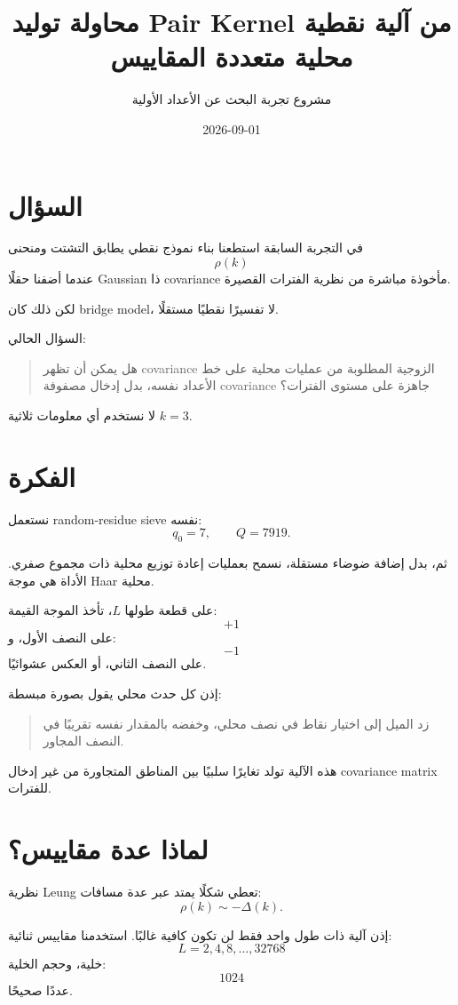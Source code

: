 \documentclass[12pt]{article}
\title{محاولة توليد Pair Kernel من آلية نقطية محلية متعددة المقاييس}
\author{مشروع تجربة البحث عن الأعداد الأولية}
\date{2026-09-01}
\begin{document}
\maketitle

\section{السؤال}

في التجربة السابقة استطعنا بناء نموذج نقطي يطابق التشتت ومنحنى
\[
\rho(k)
\]
عندما أضفنا حقلًا Gaussian ذا covariance مأخوذة مباشرة من نظرية الفترات القصيرة.

لكن ذلك كان bridge model، لا تفسيرًا نقطيًا مستقلًا.

السؤال الحالي:

\begin{quote}
هل يمكن أن تظهر covariance الزوجية المطلوبة من عمليات محلية على خط الأعداد نفسه،
بدل إدخال مصفوفة covariance جاهزة على مستوى الفترات؟
\end{quote}

لا نستخدم أي معلومات ثلاثية \(k=3\).

\section{الفكرة}

نستعمل random-residue sieve نفسه:
\[
q_0=7,\qquad Q=7919.
\]

ثم، بدل إضافة ضوضاء مستقلة، نسمح بعمليات إعادة توزيع محلية ذات مجموع صفري.
الأداة هي موجة Haar محلية.

على قطعة طولها \(L\)، تأخذ الموجة القيمة:
\[
+1
\]
على النصف الأول، و:
\[
-1
\]
على النصف الثاني، أو العكس عشوائيًا.

إذن كل حدث محلي يقول بصورة مبسطة:

\begin{quote}
زد الميل إلى اختيار نقاط في نصف محلي، وخفضه بالمقدار نفسه تقريبًا في النصف المجاور.
\end{quote}

هذه الآلية تولد تغايرًا سلبيًا بين المناطق المتجاورة من غير إدخال
covariance matrix للفترات.

\section{لماذا عدة مقاييس؟}

نظرية Leung تعطي شكلًا يمتد عبر عدة مسافات:
\[
\rho(k)\sim-\Delta(k).
\]

إذن آلية ذات طول واحد فقط لن تكون كافية غالبًا.
استخدمنا مقاييس ثنائية:
\[
L=2,4,8,\ldots,32768
\]
خلية، وحجم الخلية:
\[
1024
\]
عددًا صحيحًا.
\end{document}
